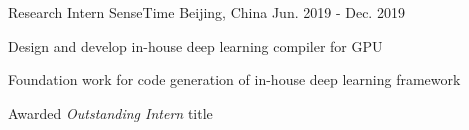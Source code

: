 \begin{cventries}
\end{cventries}


\begin{cventries}
    \cventry
    {Research Intern}
    {SenseTime}
    {Beijing, China}
    {Jun. 2019 - Dec. 2019}
    {
        \begin{cvitems}
        \item {Design and develop in-house deep learning compiler for GPU}
        \item {Foundation work for code generation of in-house deep learning framework}
        \item {Awarded \textit{Outstanding Intern} title}
        \end{cvitems}
    }
\end{cventries}
